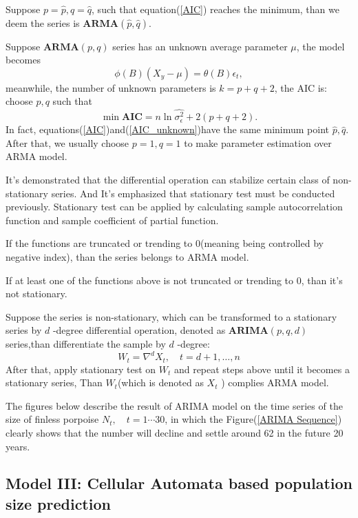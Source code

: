 \documentclass{mcmthesis}
\numberwithin{figure}{section}
\numberwithin{table}{section}
\numberwithin{equation}{section}
\begin{document}
Suppose $ p = \hat{p}, q = \hat{q} $, such that equation(\ref{AIC}) reaches the minimum,
than we deem the series is $ \mathbf{ARMA}(\hat{p},\hat{q}) $. 
\par
Suppose $ \mathbf{ARMA}(p,q) $ series has an unknown average parameter $ \mu $,
the model becomes
$$
  \phi(B)(X_y-\mu) = \theta(B)\epsilon_t,
$$   
meanwhile, the number of unknown parameters is $ k = p+q+2 $, the AIC is:
choose $ p,q $ such that
\begin{equation}\label{AIC_unknown}
  \min \mathbf{AIC} = n\ln\hat{\sigma_\epsilon^2}+2(p+q+2).
\end{equation}  
In fact, equations(\ref{AIC})and(\ref{AIC_unknown})have the same minimum point $ \hat{p},\hat{q} $.
After that, we usually choose $ p = 1, q = 1 $ to make parameter estimation 
over ARMA model.
\par
It's demonstrated that the differential operation can stabilize 
certain class of non-stationary series. And It's emphasized that 
stationary test must be conducted previously. Stationary test can 
be applied by calculating sample autocorrelation function and 
sample coefficient of partial function. 
\par
If the functions are truncated or trending to 0(meaning being controlled
by negative index), than the series belongs to ARMA model.
\par
If at least one of the functions above is not truncated or trending to 0, than
it's not stationary.
\par
Suppose the series is non-stationary, which can be transformed to 
a stationary series by $ d $ -degree differential operation, denoted
as $ \mathbf{ARIMA}(p,q,d) $ series,than differentiate the sample by
$ d $ -degree:
$$
  W_t = \nabla^dX_t,\quad t = d+1,\dots , n
$$ 
After that, apply stationary test on $ W_t $ and repeat steps above 
until it becomes a stationary series, Than $ W_t $(which is denoted
as $ X_t $ ) complies ARMA model. 
\par
The figures below describe the result of ARIMA model on the 
time series of the size of finless porpoise $ N_t, \quad t = 1\cdots 30 $,
in which the Figure(\ref{ARIMA Sequence}) clearly shows that the number
will decline and settle around 62 in the future 20 years. 

\subsection{Model III: Cellular Automata based population size prediction}
\end{document}
